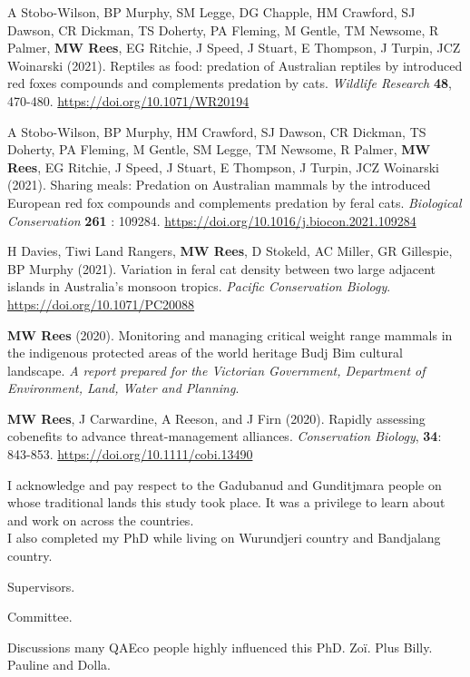 \documentclass[11pt,a4paper,titlepage,twoside,openright]{style/unimelbthesis}
\begin{document}
\begin{frontmatter}
\begin{preface}
    A Stobo-Wilson, BP Murphy, SM Legge, DG Chapple, HM Crawford, SJ Dawson, CR Dickman, TS Doherty, PA Fleming, M Gentle, TM Newsome, R Palmer, \textbf{MW Rees}, EG Ritchie, J Speed, J Stuart, E Thompson, J Turpin, JCZ Woinarski (2021). Reptiles as food: predation of Australian reptiles by introduced red foxes compounds and complements predation by cats. \emph{Wildlife Research} \textbf{48}, 470-480. \url{https://doi.org/10.1071/WR20194}
    
    A Stobo-Wilson, BP Murphy, HM Crawford, SJ Dawson, CR Dickman, TS Doherty, PA Fleming, M Gentle, SM Legge, TM Newsome, R Palmer, \textbf{MW Rees}, EG Ritchie, J Speed, J Stuart, E Thompson, J Turpin, JCZ Woinarski (2021). Sharing meals: Predation on Australian mammals by the introduced European red fox compounds and complements predation by feral cats. \emph{Biological Conservation} \textbf{261} : 109284. \url{https://doi.org/10.1016/j.biocon.2021.109284}
    
    H Davies, Tiwi Land Rangers, \textbf{MW Rees}, D Stokeld, AC Miller, GR Gillespie, BP Murphy (2021). Variation in feral cat density between two large adjacent islands in Australia's monsoon tropics. \emph{Pacific Conservation Biology}. \url{https://doi.org/10.1071/PC20088}
    
    \textbf{MW Rees} (2020). Monitoring and managing critical weight range mammals in the indigenous protected areas of the world heritage Budj Bim cultural landscape. \emph{A report prepared for the Victorian Government, Department of Environment, Land, Water and Planning}.
    
    \textbf{MW Rees}, J Carwardine, A Reeson, and J Firn (2020). Rapidly assessing cobenefits to advance threat-management alliances. \emph{Conservation Biology}, \textbf{34}: 843-853. \url{https://doi.org/10.1111/cobi.13490}
  \end{preface}
  \begin{acknowledgements}
    I acknowledge and pay respect to the Gadubanud and Gunditjmara people on whose traditional lands this study took place. It was a privilege to learn about and work on across the countries.\\
    I also completed my PhD while living on Wurundjeri country and Bandjalang country.
    
    Supervisors.
    
    Committee.
    
    Discussions many QAEco people highly influenced this PhD. Zoï. Plus Billy.
    Pauline and Dolla.
    

\end{acknowledgements}
\end{frontmatter}
\end{document}

